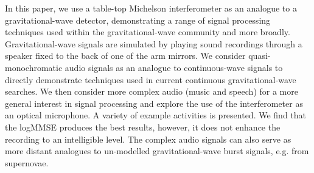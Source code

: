 \documentclass[paper-main.tex]{subfiles}
\begin{document}
In this paper, we use a table-top Michelson interferometer as an analogue to a gravitational-wave detector, demonstrating a range of signal processing techniques used within the gravitational-wave community and more broadly. 
Gravitational-wave signals are simulated by playing sound recordings through a speaker fixed to the back of one of the arm mirrors. 
We consider quasi-monochromatic audio signals as an analogue to continuous-wave signals to directly demonstrate techniques used in current continuous gravitational-wave searches.
We then consider more complex audio (music and speech) for a more general interest in signal processing and explore the use of the interferometer as an optical microphone. 
A variety of example activities is presented. 
We find that the logMMSE produces the best results, however, it does not enhance the recording to an intelligible level. 
The complex audio signals can also serve as more distant analogues to un-modelled gravitational-wave burst signals, e.g. from supernovae. 
\end{document}
